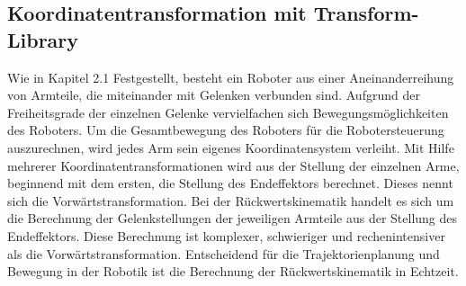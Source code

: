 \subsection{Koordinatentransformation mit Transform-Library} \label{ssec:tf2}
Wie in Kapitel 2.1 Festgestellt, besteht ein Roboter aus einer Aneinanderreihung von Armteile, die miteinander mit Gelenken verbunden sind. Aufgrund der Freiheitsgrade der einzelnen Gelenke vervielfachen sich Bewegungsmöglichkeiten des Roboters. Um die Gesamtbewegung des Roboters für die Robotersteuerung auszurechnen, wird jedes Arm sein eigenes Koordinatensystem verleiht. Mit Hilfe mehrerer Koordinatentransformationen wird aus der Stellung der einzelnen Arme, beginnend mit dem ersten, die Stellung des Endeffektors berechnet. Dieses nennt sich die Vorwärtstransformation. Bei der Rückwertskinematik handelt es sich um die Berechnung der Gelenkstellungen der jeweiligen Armteile aus der Stellung des Endeffektors. Diese Berechnung ist komplexer, schwieriger und rechenintensiver als die Vorwärtstransformation. Entscheidend für die Trajektorienplanung und Bewegung in der Robotik ist die Berechnung der Rückwertskinematik in Echtzeit. \autocite[65-66]{maier2022grundlagen}

